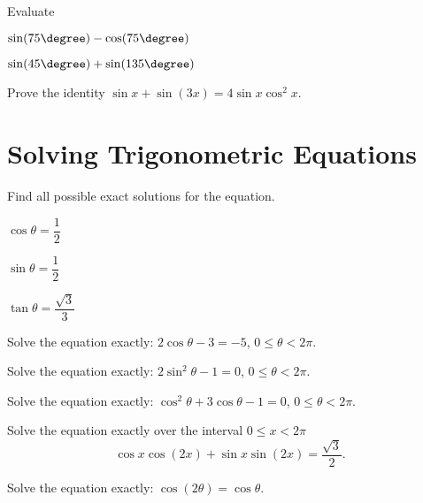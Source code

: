 \newpage

\begin{exercise}
  Evaluate
  \begin{enumerate*}
    \item $\sin(75\degree)-\cos(75\degree)$
    \item $\sin(45\degree)+\sin(135\degree)$
  \end{enumerate*}
\end{exercise}

\begin{exercise}
  Prove the identity $\sin x + \sin(3x)=4\sin x\cos^2 x$.
\end{exercise}

\newpage

\section{Solving Trigonometric Equations}
\begin{example}
  Find all possible exact solutions for the equation.\\
  \begin{enumerate*}
    \item $\cos \theta=\dfrac{1}{2}$
    \item $\sin \theta=\dfrac{1}{2}$
    \item $\tan \theta=\dfrac{\sqrt{3}}{3}$\hfill\null
  \end{enumerate*}
\end{example}

\begin{example}
  Solve the equation exactly: $2\cos \theta-3=-5$, $0\le \theta<2\pi$.
\end{example}

\begin{example}
  Solve the equation exactly:  $2\sin^2\theta-1=0$, $0\le \theta<2\pi$.
\end{example}

\newpage

\begin{example}
  Solve the equation exactly: $\cos^2\theta+3 \cos \theta-1=0$, $0\le \theta<2\pi$.
\end{example}

\begin{example}
  Solve the equation exactly over the interval $0\le x<2\pi$
\[\cos x \cos(2x)+\sin x \sin(2x)=\dfrac{\sqrt{3}}{2}.\]
\end{example}

\begin{example}
  Solve the equation exactly: $\cos(2\theta)=\cos\theta$.
\end{example}

